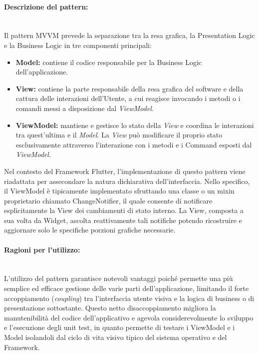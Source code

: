 \documentclass[a4paper,12pt]{article}
\newcommand{\ignoreglossary}{}
\newcommand{\code}[1]{{\ttfamily\textcolor{purple!85!black}{#1}}}
\begin{document}
\paragraph{Descrizione del pattern:}\mbox{}\\
Il pattern MVVM prevede la separazione tra la resa grafica, la Presentation Logic e la Business Logic in tre componenti principali:
\begin{itemize}
    \item \textbf{Model:} contiene il codice responsabile per la Business Logic dell'applicazione.
    \item \textbf{View:} contiene la parte responsabile della resa grafica del software e della cattura delle interazioni dell'Utente, a cui reagisce invocando i metodi o i comandi messi a disposizione dal \textit{ViewModel}.
    \item \textbf{ViewModel:} mantiene e gestisce lo stato della \textit{View} e coordina le interazioni tra quest'ultima e il \textit{Model}. La \textit{View} può modificare il proprio stato esclusivamente attraverso l'interazione con i metodi e i \code{Command} esposti dal \textit{ViewModel}.
\end{itemize}
Nel contesto del Framework Flutter, l'implementazione di questo pattern viene riadattata per assecondare la natura dichiarativa dell'interfaccia. Nello specifico, il ViewModel è tipicamente implementato sfruttando una classe o un mixin proprietario chiamato \code{ChangeNotifier}, il quale consente di notificare esplicitamente la View dei cambiamenti di stato interno. La View, composta a sua volta da Widget, ascolta reattivamente tali notifiche potendo ricostruire e aggiornare solo le specifiche porzioni grafiche necessarie.
\paragraph{Ragioni per l'utilizzo:}\mbox{}\\
L'utilizzo del pattern garantisce notevoli vantaggi poiché permette una più semplice ed efficace gestione delle varie parti dell'applicazione, limitando il forte accoppiamento (\textit{coupling}) tra l'interfaccia \ignoreglossary{utente} visiva e la logica di business o di presentazione sottostante. Questo netto disaccoppiamento migliora la manutenibilità del codice dell'applicativo e agevola considerevolmente lo sviluppo e l'esecuzione degli unit test, in quanto permette di testare i ViewModel e i Model isolandoli dal \ignoreglossary{ciclo di vita} visivo tipico del sistema operativo e del Framework.
\end{document}
